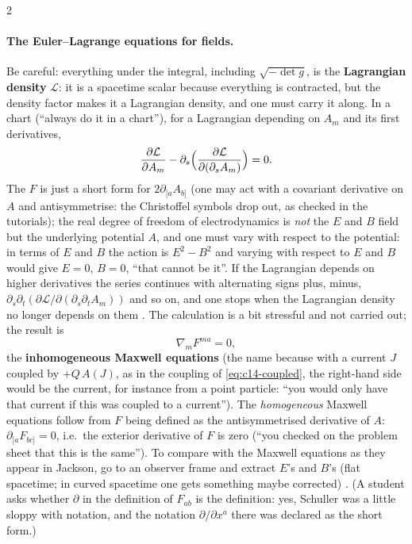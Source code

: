 \begin{paracol}{2}
\paragraph{The Euler--Lagrange equations for fields.} Be careful: everything under the integral, including $\sqrt{-\det g}$, is the \textbf{Lagrangian density} $\mathcal L$: it is a spacetime scalar because everything is contracted, but the density factor makes it a Lagrangian density, and one must carry it along. In a chart (``always do it in a chart''), for a Lagrangian depending on $A_m$ and its first derivatives,
\[
  \frac{\partial\mathcal L}{\partial A_m}-\partial_s\Bigl(\frac{\partial\mathcal L}{\partial(\partial_sA_m)}\Bigr)=0.
\]
The $F$ is just a short form for $2\partial_{[a}A_{b]}$ (one may act with a covariant derivative on $A$ and antisymmetrise: the Christoffel symbols drop out, as checked in the tutorials); the real degree of freedom of electrodynamics is \emph{not} the $E$ and $B$ field but the underlying potential $A$, and one must vary with respect to the potential: in terms of $E$ and $B$ the action is $E^2-B^2$ and varying with respect to $E$ and $B$ would give $E=0$, $B=0$, ``that cannot be it''. If the Lagrangian depends on higher derivatives the series continues with alternating signs plus, minus, $\partial_s\partial_t(\partial\mathcal L/\partial(\partial_s\partial_tA_m))$ and so on, and one stops when the Lagrangian density no longer depends on them .
The calculation is a bit stressful and not carried out; the result is
\[
  \nabla_m F^{ma}=0,
\]
the \textbf{inhomogeneous Maxwell equations} (the name because with a current $J$ coupled by $+Q\,A(J)$, as in the coupling of \eqref{eq:c14-coupled}, the right-hand side would be the current, for instance from a point particle: ``you would only have that current if this was coupled to a current''). The \emph{homogeneous} Maxwell equations follow from $F$ being defined as the antisymmetrised derivative of $A$: $\partial_{[a}F_{bc]}=0$, i.e.\ the exterior derivative of $F$ is zero (``you checked on the problem sheet that this is the same''). To compare with the Maxwell equations as they appear in Jackson, go to an observer frame and extract $E$'s and $B$'s (flat spacetime; in curved spacetime one gets something maybe corrected) .
(A student asks whether $\partial$ in the definition of $F_{ab}$ is the definition: yes, Schuller was a little sloppy with notation, and the notation $\partial/\partial x^a$ there was declared as the short form.)


\end{paracol}

